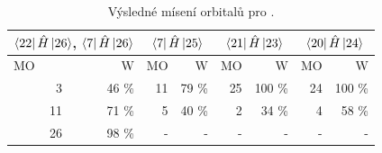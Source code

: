 \documentclass[
  printed, %
  table,   %
  lof,     %
  lot,     %
  oneside,
]{fithesis3}
\begin{document}
\begin{table}[htbp]
\caption{Výsledné mísení orbitalů pro .}
\begin{center}
\begin{tabular}{|r|r|r|r|r|r|r|r|}
\hline
\multicolumn{2}{|c|}{$\bra{22}{\hat{H}}\ket{26}$, $\bra{7}{\hat{H}}\ket{26}$} & \multicolumn{2}{|c|}{$\bra{7}{\hat{H}}\ket{25}$}& \multicolumn{2}{|c|}{$\bra{21}{\hat{H}}\ket{23}$} &\multicolumn{2}{|c|}{$\bra{20}{\hat{H}}\ket{24}$} \\
\hline
\hline
\multicolumn{1}{|l|}{MO} & \multicolumn{1}{r|}{W} & \multicolumn{1}{l|}{MO} & \multicolumn{1}{r|}{W} & MO & \multicolumn{1}{r|}{W}& MO & \multicolumn{1}{r|}{W} \\ \hline
3 & 46 \% & 11 & 79 \% &25 & 100 \%& 24 & 100 \% \\ \hline
11 & 71 \% & 5 & 40 \% & 2 & 34 \% &4 & 58 \% \\ \hline
26 & 98 \% & - & - &  -& - &-&- \\ \hline
\end{tabular}
\end{center}
\label{tab_sioh3ch3_vysledky}
\end{table}
\end{document}
